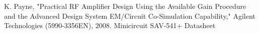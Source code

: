 \documentclass[conference]{IEEEtran}
\begin{document}
\begin{thebibliography}{1}
K. Payne, "Practical RF Amplifier Design Using the Available Gain Procedure and the Advanced Design System EM/Circuit Co-Simulation Capability," Agilent Technologies (5990-3356EN), 2008.
Minicircuit SAV-541+ Datasheet
\end{thebibliography}
\end{document}
